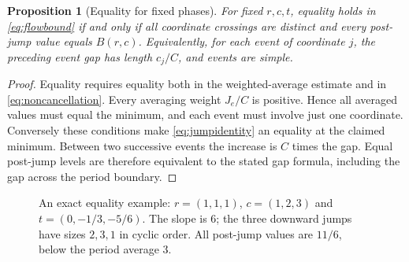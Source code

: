 \documentclass[11pt,a4paper]{article}
\newtheorem{proposition}[theorem]{Proposition}
\theoremstyle{definition}\newtheorem{definition}[theorem]{Definition}
\theoremstyle{remark}\newtheorem{remark}[theorem]{Remark}
\begin{document}
\begin{proposition}[Equality for fixed phases]\label{prop:phaseeq}
For fixed $r,c,t$, equality holds in \eqref{eq:flowbound} if and only
if all coordinate crossings are distinct and every post-jump value
equals $B(r,c)$. Equivalently, for each event of coordinate $j$,
the preceding event gap has length $c_j/C$, and events are simple.
\end{proposition}
\begin{proof}
Equality requires equality both in the weighted-average estimate
and in \eqref{eq:noncancellation}. Every averaging weight $J_e/C$
is positive. Hence all averaged values must equal the minimum, and
each event must involve just one coordinate. Conversely these
conditions make \eqref{eq:jumpidentity} an equality at the claimed
minimum. Between two successive events the increase is $C$ times
the gap. Equal post-jump levels are therefore equivalent to the
stated gap formula, including the gap across the period boundary.
\end{proof}

\begin{figure}[ht]
\centering
{}
\caption{An exact equality example: $r=(1,1,1)$,
$c=(1,2,3)$ and $t=(0,-1/3,-5/6)$. The slope is $6$;
the three downward jumps have sizes $2,3,1$ in cyclic order.
All post-jump values are $11/6$, below the period average $3$.}
\label{fig:flow}
\end{figure}
\end{document}
